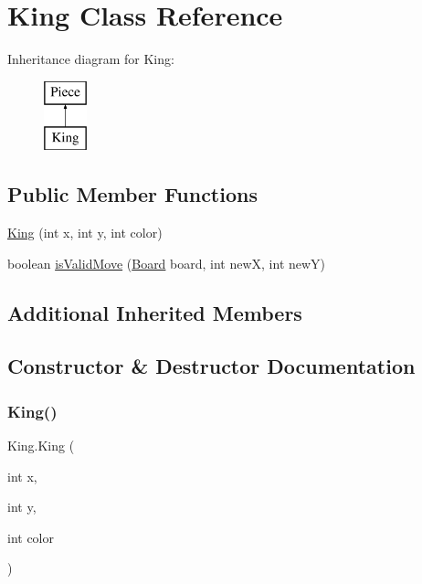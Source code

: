 \hypertarget{class_king}{}\section{King Class Reference}
\label{class_king}
Inheritance diagram for King\+:\begin{figure}[H]
\begin{center}
\leavevmode
\includegraphics[height=2.000000cm]{class_king}
\end{center}
\end{figure}
\subsection*{Public Member Functions}
\begin{DoxyCompactItemize}
\item 
\mbox{\hyperlink{class_king_a82a486225af09c031b59130878304355}{King}} (int x, int y, int color)
\item 
boolean \mbox{\hyperlink{class_king_a871afc5b636135ddb2ff259e3b12f59c}{is\+Valid\+Move}} (\mbox{\hyperlink{class_board}{Board}} board, int newX, int newY)
\end{DoxyCompactItemize}
\subsection*{Additional Inherited Members}


\subsection{Constructor \& Destructor Documentation}
\mbox{\label{class_king_a82a486225af09c031b59130878304355}} 
\subsubsection{\texorpdfstring{King()}{King()}}
{\footnotesize\ttfamily King.\+King (\begin{DoxyParamCaption}\item[{int}]{x,  }\item[{int}]{y,  }\item[{int}]{color }\end{DoxyParamCaption})\hspace{0.3cm}{\ttfamily [inline]}}


